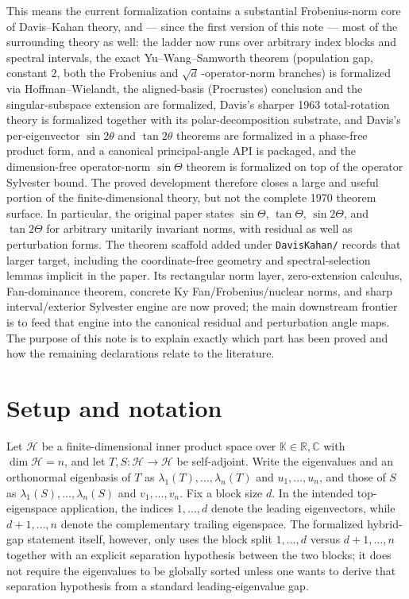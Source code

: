 \documentclass[11pt]{article}
\theoremstyle{remark}
\begin{document}
This means the current formalization contains a substantial Frobenius-norm core
of Davis--Kahan theory, and --- since the first version of this note --- most of
the surrounding theory as well: the ladder now runs over arbitrary index blocks
and spectral intervals, the exact Yu--Wang--Samworth theorem (population gap,
constant $2$, both the Frobenius and $\sqrt d\,$-operator-norm branches) is
formalized via Hoffman--Wielandt, the aligned-basis (Procrustes) conclusion and
the singular-subspace extension are formalized, Davis's sharper 1963
total-rotation theory is formalized together with its polar-decomposition
substrate, and Davis's per-eigenvector $\sin2\theta$ and $\tan2\theta$ theorems
are formalized in a phase-free product form, and a canonical principal-angle
API is packaged, and the dimension-free operator-norm $\sin\Theta$ theorem is
formalized on top of the operator Sylvester bound.  The proved development
therefore closes a large and useful portion of the finite-dimensional theory,
but not the complete 1970 theorem surface.  In particular, the original paper
states $\sin\Theta$, $\tan\Theta$, $\sin2\Theta$, and $\tan2\Theta$ for
arbitrary unitarily invariant norms, with residual as well as perturbation
forms.  The theorem scaffold added under
\texttt{DavisKahan/} records that
larger target, including the coordinate-free geometry and spectral-selection
lemmas implicit in the paper.  Its rectangular norm layer, zero-extension
calculus, Fan-dominance theorem, concrete Ky Fan/Frobenius/nuclear norms, and
sharp interval/exterior Sylvester engine are now proved; the main downstream
frontier is to feed that engine into the canonical residual and perturbation
angle maps.  The purpose of this note is to explain exactly which part has been
proved and how the remaining declarations relate to the literature.




\section{Setup and notation}

Let $\mathcal H$ be a finite-dimensional inner product space over
$\mathbb K\in{\mathbb R,\mathbb C}$ with $\dim\mathcal H=n$, and let
$T,S:\mathcal H\to\mathcal H$ be self-adjoint.  Write the eigenvalues and an
orthonormal eigenbasis of $T$ as $\lambda_1(T),\dots,\lambda_n(T)$ and
$u_1,\dots,u_n$, and those of $S$ as $\lambda_1(S),\dots,\lambda_n(S)$ and
$v_1,\dots,v_n$.  Fix a block size $d$.  In the intended top-eigenspace
application, the indices $1,\dots,d$ denote the leading eigenvectors, while
$d+1,\dots,n$ denote the complementary trailing eigenspace.  The formalized
hybrid-gap statement itself, however, only uses the block split
${1,\dots,d}$ versus ${d+1,\dots,n}$ together with an explicit separation
hypothesis between the two blocks; it does not require the eigenvalues to be
globally sorted unless one wants to derive that separation hypothesis from a
standard leading-eigenvalue gap.
\end{document}
